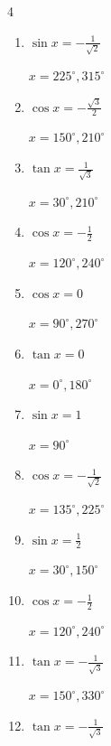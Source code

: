 \begin{multicols}{4}
\begin{enumerate}
        $\displaystyle x = 210^{\circ} , 330^{\circ}$

  \item $\displaystyle \sin{x}  = -\frac{1}{\sqrt{2}}$

        $\displaystyle x = 225^{\circ} , 315^{\circ}$

  \item $\displaystyle \cos{x}  = -\frac{\sqrt{3}}{2}$

        $\displaystyle x = 150^{\circ} , 210^{\circ}$

  \item $\displaystyle \tan{x}  = \frac{1}{\sqrt{3}}$

        $\displaystyle x = 30^{\circ} , 210^{\circ}$

  \item $\displaystyle \cos{x}  = -\frac{1}{2}$

        $\displaystyle x = 120^{\circ} , 240^{\circ}$

  \item $\displaystyle \cos{x}  = 0$

        $\displaystyle x = 90^{\circ} , 270^{\circ}$

  \item $\displaystyle \tan{x}  = 0$

        $\displaystyle x = 0^{\circ} , 180^{\circ}$

  \item $\displaystyle \sin{x}  = 1$

        $\displaystyle x = 90^{\circ}$

  \item $\displaystyle \cos{x}  = -\frac{1}{\sqrt{2}}$

        $\displaystyle x = 135^{\circ} , 225^{\circ}$

  \item $\displaystyle \sin{x}  = \frac{1}{2}$

        $\displaystyle x = 30^{\circ} , 150^{\circ}$

  \item $\displaystyle \cos{x}  = -\frac{1}{2}$

        $\displaystyle x = 120^{\circ} , 240^{\circ}$

  \item $\displaystyle \tan{x}  = -\frac{1}{\sqrt{3}}$

        $\displaystyle x = 150^{\circ} , 330^{\circ}$

  \item $\displaystyle \tan{x}  = -\frac{1}{\sqrt{3}}$


\end{enumerate}
\end{multicols}
